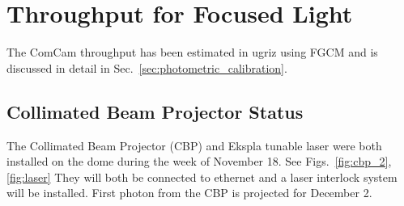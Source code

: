 \section{Throughput for Focused Light}
\label{sec:throughout_for_focused_light}

The ComCam throughput has been estimated in ugriz using FGCM and is discussed in detail in Sec.~\ref{sec:photometric_calibration}.

\subsection{Collimated Beam Projector Status}

The Collimated Beam Projector (CBP) and Ekspla tunable laser were both installed on the dome during the week
of November 18. See Figs.~\ref{fig:cbp_2}, \ref{fig:laser} They will both be connected to ethernet and a laser interlock system will be installed. First photon from the CBP is projected for December 2.

  
